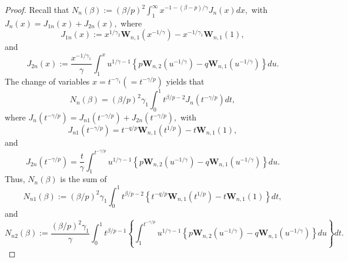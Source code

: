 \documentclass[reqno,openbib,runningheads,a4paper,12pt]{amsart}%
\begin{document}
\begin{proof}
Recall that $N_{n}\left(  \beta\right)  :=\left(  \beta/p\right)  ^{2}\int%
_{1}^{\infty}x^{-1-\left(  \beta-p\right)  /\gamma}J_{n}\left(  x\right)  dx,$
with $J_{n}\left(  x\right)  =J_{1n}\left(  x\right)  +J_{2n}\left(  x\right)
,$ where%
\[
J_{1n}\left(  x\right)  :=x^{1/\gamma_{2}}\mathbf{W}_{n,1}\left(
x^{-1/\gamma}\right)  -x^{-1/\gamma_{1}}\mathbf{W}_{n,1}\left(  1\right)  ,
\]
and
\[
J_{2n}\left(  x\right)  :=\dfrac{x^{-1/\gamma_{1}}}{\gamma}%
{\displaystyle\int_{1}^{x}}
u^{1/\gamma-1}\left\{  p\mathbf{W}_{n,2}\left(  u^{-1/\gamma}\right)
-q\mathbf{W}_{n,1}\left(  u^{-1/\gamma}\right)  \right\}  du.
\]
The change of variables $x=t^{-\gamma_{1}}\left(  =t^{-\gamma/p}\right)  $
yields that%
\[
N_{n}\left(  \beta\right)  =\left(  \beta/p\right)  ^{2}\gamma_{1}\int_{0}%
^{1}t^{\beta/p-2}J_{n}\left(  t^{-\gamma/p}\right)  dt,
\]
where $J_{n}\left(  t^{-\gamma/p}\right)  =J_{n1}\left(  t^{-\gamma/p}\right)
+J_{2n}\left(  t^{-\gamma/p}\right)  ,$ with
\[
J_{n1}\left(  t^{-\gamma/p}\right)  =t^{-q/p}\mathbf{W}_{n,1}\left(
t^{1/p}\right)  -t\mathbf{W}_{n,1}\left(  1\right)  ,
\]
and
\[
J_{2n}\left(  t^{-\gamma/p}\right)  =\dfrac{t}{\gamma}%
{\displaystyle\int_{1}^{t^{-\gamma/p}}}
u^{1/\gamma-1}\left\{  p\mathbf{W}_{n,2}\left(  u^{-1/\gamma}\right)
-q\mathbf{W}_{n,1}\left(  u^{-1/\gamma}\right)  \right\}  du.
\]
Thus, $N_{n}\left(  \beta\right)  $ is the sum of
\[
N_{n1}\left(  \beta\right)  :=\left(  \beta/p\right)  ^{2}\gamma_{1}\int%
_{0}^{1}t^{\beta/p-2}\left\{  t^{-q/p}\mathbf{W}_{n,1}\left(  t^{1/p}\right)
-t\mathbf{W}_{n,1}\left(  1\right)  \right\}  dt,
\]
and%
\[
N_{n2}\left(  \beta\right)  :=\frac{\left(  \beta/p\right)  ^{2}\gamma_{1}%
}{\gamma}\int_{0}^{1}t^{\beta/p-1}\left\{
{\displaystyle\int_{1}^{t^{-\gamma/p}}}
u^{1/\gamma-1}\left\{  p\mathbf{W}_{n,2}\left(  u^{-1/\gamma}\right)
-q\mathbf{W}_{n,1}\left(  u^{-1/\gamma}\right)  \right\}  du\right\}  dt.
\]



\end{proof}
\end{document}
